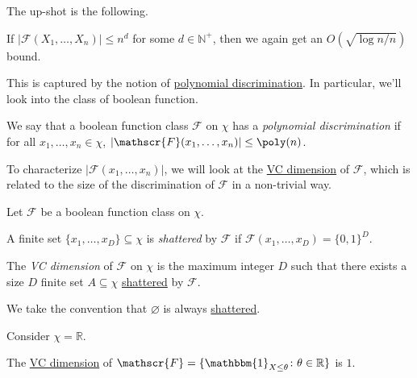 The up-shot is the following.

\begin{remark}
	If \(\vert \mathscr{F} (X_1, \dots , X_n) \vert \leq n^d\) for some \(d\in \mathbb{N}^+ \), then we again get an \(O(\sqrt{\log n / n} )\) bound.
\end{remark}

This is captured by the notion of \hyperref[def:polynomial-discrimination]{polynomial discrimination}. In particular, we'll look into the class of boolean function.

\begin{definition}\label{def:polynomial-discrimination}
	We say that a boolean function class \(\mathscr{F} \) on \(\chi \) has a \emph{polynomial discrimination} if for all \(x_1, \dots , x_n\in \chi \), \(\left\vert \mathscr{F} (x_1, \dots , x_n) \right\vert \leq \poly(n)\).
\end{definition}

To characterize \(\vert \mathscr{F} (x_1, \dots , x_n) \vert \), we will look at the \hyperref[def:VC-dimension]{VC dimension} of \(\mathscr{F} \), which is related to the size of the discrimination of \(\mathscr{F} \) in a non-trivial way.

\begin{definition*}
	Let \(\mathscr{F} \) be a boolean function class on \(\chi \).
	\begin{definition}[Shatter]\label{def:shatter}
		A finite set \(\{ x_1, \dots , x_D \} \subseteq \chi \) is \emph{shattered} by \(\mathscr{F} \) if \(\mathscr{F} (x_1, \dots , x_D) = \{ 0, 1 \} ^D\).
	\end{definition}

	\begin{definition}\label{def:VC-dimension}
		The \emph{VC dimension} of \(\mathscr{F} \) on \(\chi \) is the maximum integer \(D\) such that there exists a size \(D\) finite set \(A \subseteq \chi \) \hyperref[def:shatter]{shattered} by \(\mathscr{F} \).
	\end{definition}
\end{definition*}


\begin{remark}
	We take the convention that \(\varnothing \) is always \hyperref[def:shatter]{shattered}.
\end{remark}

Consider \(\chi = \mathbb{R} \).

\begin{eg}
	The \hyperref[def:VC-dimension]{VC dimension} of \(\mathscr{F} = \{ \mathbbm{1}_{X \leq \theta } \colon \theta \in \mathbb{R} \} \) is \(1\).
\end{eg}

